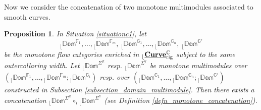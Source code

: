 \documentclass[reqno, 10pt]{amsart}
\numberwithin{equation}{section}
\numberwithin{equation}{section}
\newtheorem{prop}[thm]{Proposition}
\theoremstyle{definition}
\theoremstyle{remark}
\newcommand{\beqn}{\begin{equation*}}
\newcommand{\eeqn}{\end{equation*}}
\newcommand{\mb}{\mathbb}
\renewcommand{\outer}{{}_{\lfloor}}
\newcommand{\uds}[1]{\underline{\smash{#1}}}
\begin{document}
Now we consider the concatenation of two monotone multimodules associated to smooth curves.

\begin{prop}\label{prop_domain_concatenation}
In Situation \ref{situationc1}, let 
\beqn
\outer \mb{Dom}^{{\mb F}_1},  \ldots, \outer \mb{Dom}^{{\mb F}_m},\ \outer \mb{Dom}^{{\mb G}_1}, \ldots, \outer \mb{Dom}^{{\mb G}_n},\ \outer \mb{Dom}^{{\mb G}'}
\eeqn
be the monotone flow categories enriched in $\outer \uds{\bf Curve}_{\rm rig}^{\mb C}$ subject to the same outercollaring width. Let $\outer \mb{Dom}^{\Sigma^{\mb X}}$ resp. $\outer \mb{Dom}^{\Sigma^{{\mb Y}}}$ be monotone multimodules over $(\outer \mb{Dom}^{{\mb F}_1}, \ldots, \outer \mb{Dom}^{{\mb F}_m}; \outer \mb{Dom}^{{\mb G}_i})$ resp. over $(\outer \mb{Dom}^{{\mb G}_1}, \ldots, \outer \mb{Dom}^{{\mb G}_n}; \outer \mb{Dom}^{{\mb G}'})$ constructed in Subsection \ref{subsection_domain_multimodule}. Then there exists a concatenation $\outer \mb{Dom}^{\Sigma^{\mb X}} \circ_i \outer \mb{Dom}^{\Sigma^{{\mb Y}}}$ (see Definition \ref{defn_monotone_concatenation}). 
\end{prop}
\end{document}
